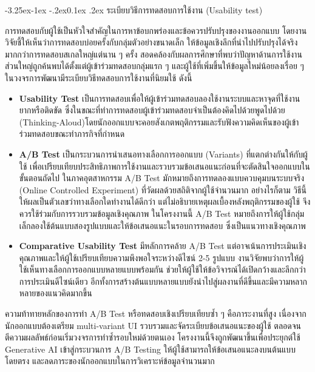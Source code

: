 \documentclass[a4paper,oneside]{cpe-thesis-th}
\makeatletter
\renewcommand\subsection{\@startsection{subsection}{2}{\z@}%
   {-3.25ex\@plus -1ex \@minus -.2ex}{0.1ex \@plus .2ex}%
   {\normalfont\thsz@subsection\bfseries}}
\newcommand{\thaijustify}[1]{%
  \par\hspace{30pt}\justifying
  #1
}
\makeatother
\begin{document}
\subsection{ระเบียบวิธีการทดสอบการใช้งาน (Usability test)}
\thaijustify{
  การทดสอบกับผู้ใช้เป็นหัวใจสำคัญในการหาข้อบกพร่องและข้อควรปรับปรุงของงานออกแบบ โดยงานวิจัยชี้ให้เห็นว่าการทดสอบบ่อยครั้งกับกลุ่มตัวอย่างขนาดเล็ก ให้ข้อมูลเชิงลึกที่นำไปปรับปรุงได้จริงมากกว่าการทดสอบสเกลใหญ่แต่นาน ๆ ครั้ง \cite{nielsen2000five} สอดคล้องกับผลการศึกษาที่พบว่าปัญหาด้านการใช้งานส่วนใหญ่ถูกค้นพบได้ตั้งแต่ผู้เข้าร่วมทดสอบกลุ่มแรก ๆ และผู้ใช้ที่เพิ่มขึ้นให้ข้อมูลใหม่น้อยลงเรื่อย ๆ \cite{virzi1992refining, nielsen1993mathematical} ในวงจรการพัฒนามีระเบียบวิธีทดสอบการใช้งานที่นิยมใช้ ดังนี้
  \begin{itemize}
      \item \textbf{Usability Test} เป็นการทดสอบเพื่อให้ผู้เข้าร่วมทดสอบลองใช้งานระบบและหาจุดที่ใช้งานยากหรือติดขัด ซึ่งในขณะที่ทำการทดสอบผู้เข้าร่วมทดสอบจำเป็นต้องคิดไปด้วยพูดไปด้วย (Thinking-Aloud)โดยนักออกแบบจะคอยสังเกตพฤติกรรมและรับฟังความคิดเห็นของผู้เข้าร่วมทดสอบขณะทำภารกิจที่กำหนด \cite{rubin2008handbook, dumas1999practical, nielsen1993usability}
      \item \textbf{A/B Test} เป็นกระบวนการนำเสนอทางเลือกการออกแบบ (Variants) ที่แตกต่างกันให้กับผู้ใช้ เพื่อเปรียบเทียบประสิทธิภาพการใช้งานและรวบรวมข้อเสนอแนะก่อนที่จะตัดสินใจออกแบบในขั้นตอนถัดไป ในภาคอุตสาหกรรม A/B Test มักหมายถึงการทดลองแบบควบคุมบนระบบจริง (Online Controlled Experiment) ที่วัดผลด้วยสถิติจากผู้ใช้จำนวนมาก \cite{kohavi2009controlled, kohavi2020trustworthy} อย่างไรก็ตาม วิธีนี้ให้ผลเป็นตัวเลขว่าทางเลือกใดทำงานได้ดีกว่า แต่ไม่อธิบายเหตุผลเบื้องหลังพฤติกรรมของผู้ใช้ จึงควรใช้ร่วมกับการรวบรวมข้อมูลเชิงคุณภาพ \cite{nielsen2005abtesting} ในโครงงานนี้ A/B Test หมายถึงการให้ผู้ใช้กลุ่มเล็กลองใช้ต้นแบบสองรูปแบบและให้ข้อเสนอแนะในรอบการทดสอบ ซึ่งเป็นแนวทางเชิงคุณภาพ
      \item \textbf{Comparative Usability Test} มีหลักการคล้าย A/B Test แต่อาจเน้นการประเมินเชิงคุณภาพและให้ผู้ใช้เปรียบเทียบความพึงพอใจระหว่างดีไซน์ 2-5 รูปแบบ งานวิจัยพบว่าการให้ผู้ใช้เห็นทางเลือกการออกแบบหลายแบบพร้อมกัน ช่วยให้ผู้ใช้ให้ข้อวิจารณ์ได้เปิดกว้างและลึกกว่าการประเมินดีไซน์เดียว \cite{tohidi2006getting} อีกทั้งการสร้างต้นแบบหลายแบบยังนำไปสู่ผลงานที่ดีขึ้นและมีความหลากหลายของแนวคิดมากขึ้น \cite{dow2010parallel}
  \end{itemize}
  ความท้าทายหลักของการทำ A/B Test หรือทดสอบเชิงเปรียบเทียบซ้ำ ๆ คือภาระงานที่สูง เนื่องจากนักออกแบบต้องเตรียม multi-variant UI รวบรวมและจัดระเบียบข้อเสนอแนะของผู้ใช้ ตลอดจนตีความผลลัพธ์ก่อนเริ่มวงจรการทำซ้ำรอบใหม่ด้วยตนเอง โครงงานนี้จึงถูกพัฒนาขึ้นเพื่อประยุกต์ใช้ Generative AI เข้าสู่กระบวนการ A/B Testing ให้ผู้ใช้สามารถให้ข้อเสนอแนะลงบนต้นแบบโดยตรง และลดภาระของนักออกแบบในการวิเคราะห์ข้อมูลจำนวนมาก
}
\end{document}
